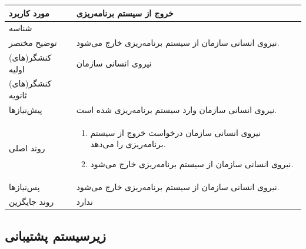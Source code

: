 \begin{table}[H]
	\centering
	\begin{tabular}{|p{3cm}|p{10cm}|}
		\hline
		مورد کاربرد & خروج از سیستم برنامه‌ریزی  \\
		\hline
		شناسه & 
		\stepcounter{usecase_ID}
		\arabic{usecase_ID} \\
		\hline
		توضیح مختصر & نیروی انسانی سازمان از سیستم برنامه‌ریزی خارج می‌شود. \\
		\hline
		کنشگر(های) اولیه & نیروی انسانی سازمان  \\
		\hline
		کنشگر(های) ثانویه &  \\
		\hline
		پیش‌نیازها & نیروی انسانی سازمان وارد سیستم برنامه‌ریزی شده است. \\
		\hline
		
		
		روند اصلی &
		\begin{enumerate}[topsep=0cm,leftmargin=0.5cm]
			\item نیروی انسانی سازمان درخواست خروج از سیستم برنامه‌ریزی را می‌دهد.
			\item نیروی انسانی سازمان از سیستم برنامه‌ریزی خارج می‌شود.
		\end{enumerate} \\
		
		\hline
		
		پس‌نیازها & نیروی انسانی سازمان از سیستم برنامه‌ریزی خارج می‌شود. \\
		\hline
		روند جایگزین & ندارد \\
		\hline
	\end{tabular}
\end{table}


\newpage
\subsection{زیرسیستم پشتیبانی}

